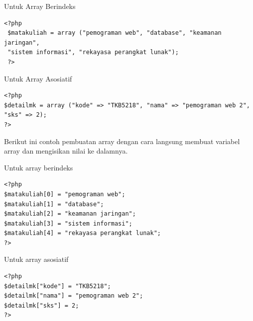 \item{Untuk Array Berindeks}
\begin{lstlisting}
<?php
 $matakuliah = array ("pemograman web", "database", "keamanan jaringan",
 "sistem informasi", "rekayasa perangkat lunak");
 ?>
\end{lstlisting}

\item{Untuk Array Asosiatif}
\begin{lstlisting}
<?php
$detailmk = array ("kode" => "TKB5218", "nama" => "pemograman web 2", "sks" => 2);
?>
\end{lstlisting}

Berikut ini contoh pembuatan array dengan cara langsung membuat variabel array dan mengisikan nilai ke dalamnya.

\item{Untuk array berindeks}
\begin{lstlisting}
<?php 
$matakuliah[0] = "pemograman web"; 
$matakuliah[1] = "database"; 
$matakuliah[2] = "keamanan jaringan"; 
$matakuliah[3] = "sistem informasi"; 
$matakuliah[4] = "rekayasa perangkat lunak"; 
?>
\end{lstlisting}

\item{Untuk array asosiatif}
\begin{lstlisting}
<?php 
$detailmk["kode"] = "TKB5218"; 
$detailmk["nama"] = "pemograman web 2"; 
$detailmk["sks"] = 2; 
?>
\end{lstlisting}


